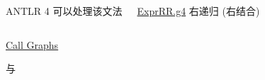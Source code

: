 \begin{frame}{}
  \begin{columns}
      \vspace{0.20cm}
      \begin{center}
        ANTLR 4 可以处理该文法
      \end{center}
      \pause
      \begin{center}
        {\Large \href{https://github.com/courses-at-nju-by-hfwei/2023-compilers-coding/blob/main/src/main/antlr/expr/ExprRR.g4}{ExprRR.g4}}
        右递归 (右结合)
      \end{center}
  \end{columns}
\end{frame}

\begin{frame}{}
  \begin{center}
    {\Large \href{https://github.com/courses-at-nju-by-hfwei/2023-compilers-coding/tree/main/src/main/java/callgraph}{Call Graphs}}
  \end{center}

  \vspace{-0.80cm}
\end{frame}

\begin{frame}{}
  \begin{center}
     与 
  \end{center}
\end{frame}

\begin{frame}{}
\end{frame}
